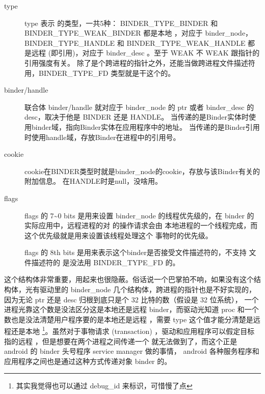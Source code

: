 \documentclass[a4paper,11pt]{article}
\begin{document}
\begin{description}
    \item [type]
        
        type 表示 \binder 的类型，一共5种：
         BINDER_TYPE_BINDER 和 BINDER_TYPE_WEAK_BINDER 都是本地 \binder，对应于
        binder_node，BINDER_TYPE_HANDLE 和 BINDER_TYPE_WEAK_HANDLE 都是远程 \binder (即引用)，对应于 binder_desc 。至于
        WEAK 不 WEAK 跟指针的引用强度有关。\binder
        除了是个跨进程的指针之外，还能当做跨进程文件描述符用，BINDER_TYPE_FD
        类型就是干这个的。
    \item [binder/handle]
        
        联合体 binder/handle 就对应于 binder_node 的 ptr 或者 binder_desc 的
        desc，取决于他是 BINDER 还是 HANDLE。
        当传递的是Binder实体时使用binder域，指向Binder实体在应用程序中的地址。
        当传递的是Binder引用时使用handle域，存放Binder在进程中的引用号。

    \item [cookie] 
        
        cookie在BINDER类型时就是binder_node的cookie，存放与该Binder有关的附加信息。
        在HANDLE时是null，没啥用。

    \item [flags]
        
            flags 的 7\~{}0 bits 是用来设置 binder_node 的线程优先级的，在
            binder 的实际应用中，远程进程的对 \binder 的操作请求会由\binder
            本地进程的一个线程完成，而这个优先级就是用来设置该线程处理这个
            \binder 事物时的优先级。

            flags 的 8th bits 是用来表示这个binder是否接受文件描述符的，不支持
            文件描述符的 \binder 是没法用 BINDER_TYPE_FD 的。
\end{description}

这个结构体非常重要，用起来也很隐蔽。俗话说一个巴掌拍不响，如果没有这个结构体，光有驱动里的
binder_node 几个结构体，跨进程的指针也是不好实现的，因为无论 ptr 还是 desc
归根到底只是个 32 比特的数（假设是 32 位系统），
一个进程光靠这个数是没法区分这是本地还是远程 binder，而驱动光知道 proc
和一个数也是没法清楚用户程序要的是本地还是远程 \binder，需要 type
这个值才能分清楚是远程还是本地 \binder \footnote{其实我觉得也可以通过 debug_id
来标识，可惜慢了点}。虽然对于事物请求 (transaction)
，驱动和应用程序可以假定目标 \binder 指的远程 \binder
，但是想要在两个进程之间传递一个 \binder 就无法做到了，而这个正是 android 的
binder 头号程序 service manager 做的事情， android
各种服务程序和应用程序之间也是通过这种方式传递对象 binder
的。
\end{document}
